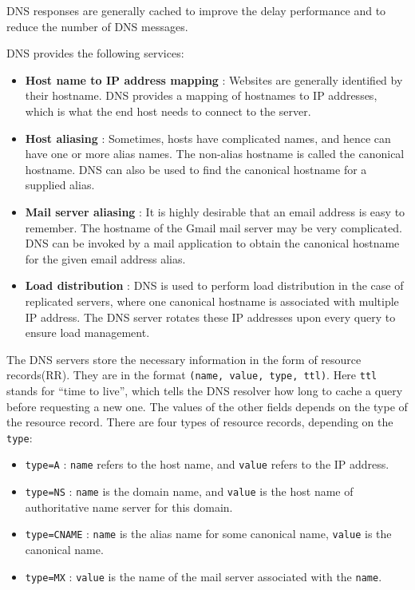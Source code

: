 \documentclass[12pt,letterpaper]{amsbook}
\theoremstyle{definition}
\begin{document}
DNS responses are generally cached to improve the delay performance and to reduce the number of DNS messages.

DNS provides the following services:

\begin{itemize}
  \item \textbf{Host name to IP address mapping} : Websites are generally identified by their hostname. DNS provides a mapping of hostnames to IP addresses, which is what the end host needs to connect to the server.
  \item \textbf{Host aliasing} : Sometimes, hosts have complicated names, and hence can have one or more alias names. The non-alias hostname is called the canonical hostname. DNS can also be used to find the canonical hostname for a supplied alias.
  \item \textbf{Mail server aliasing} : It is highly desirable that an email address is easy to remember. The hostname of the Gmail mail server may be very complicated. DNS can be invoked by a mail application to obtain the canonical hostname for the given email address alias.
  \item \textbf{Load distribution} : DNS is used to perform load distribution in the case of replicated servers, where one canonical hostname is associated with multiple IP address. The DNS server rotates these IP addresses upon every query to ensure load management.
\end{itemize}

The DNS servers store the necessary information in the form of resource records(RR). They are in the format \texttt{(name, value, type, ttl)}. Here \texttt{ttl} stands for ``time to live'', which tells the DNS resolver how long to cache a query before requesting a new one. The values of the other fields depends on the type of the resource record. There are four types of resource records, depending on the \texttt{type}:

\begin{itemize}
  \item \texttt{type=A} : \texttt{name} refers to the host name, and \texttt{value} refers to the IP address.
  \item \texttt{type=NS} : \texttt{name} is the domain name, and \texttt{value} is the host name of authoritative name server for this domain.
  \item \texttt{type=CNAME} : \texttt{name} is the alias name for some canonical name, \texttt{value} is the canonical name.
\item \texttt{type=MX} : \texttt{value} is the name of the mail server associated with the \texttt{name}.
\end{itemize}
\end{document}
